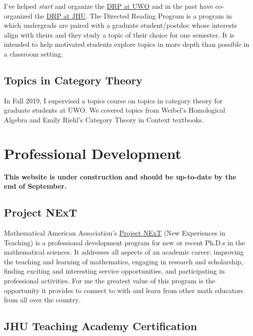 \documentclass[
]{report}
\begin{document}
I've helped \emph{start} and organize the \href{https://www.math.uwo.ca/undergraduate/current_students/directed_reading_program.html}{DRP at
UWO} and in
the past have co-organized the \href{https://math.jhu.edu/drp.html}{DRP at JHU}. The Directed Reading
Program is a program in which undergrads are paired with a graduate student/postdoc whose interests
align with theirs and they study a topic of their choice for one semester. It is intended to help
motivated students explore topics in more depth than possible in a classroom setting.

\hypertarget{topics-in-category-theory}{%
\section{Topics in Category Theory}\label{topics-in-category-theory}}

In Fall 2019, I supervised a topics course on topics in category theory for graduate students at UWO.
We covered topics from Weibel's Homological Algebra and Emily Riehl's Category Theory in Context textbooks.

\hypertarget{professional-development-1}{%
\chapter{Professional Development}\label{professional-development-1}}

\textbf{This website is under construction and should be up-to-date by the end of September.}

\hypertarget{project-next}{%
\section{Project NExT}\label{project-next}}

Mathematical American Association's \href{https://www.maa.org/programs-and-communities/professional-development/project-next}{Project
NExT} (New
Experiences in Teaching) is a professional development program for new or recent Ph.D.s in the
mathematical sciences. It addresses all aspects of an academic career: improving the teaching and
learning of mathematics, engaging in research and scholarship, finding exciting and interesting
service opportunities, and participating in professional activities. For me the greatest value of
this program is the opportunity it provides to connect to with and learn from other math educators
from all over the country.

\hypertarget{jhu-teaching-academy-certification}{%
\section{JHU Teaching Academy Certification}\label{jhu-teaching-academy-certification}}
\end{document}
